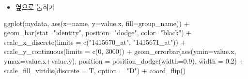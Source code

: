 \documentclass[
]{book}
\newenvironment{Shaded}{\begin{snugshade}}{\end{snugshade}}
\newcommand{\AttributeTok}[1]{\textcolor[rgb]{0.77,0.63,0.00}{#1}}
\newcommand{\DecValTok}[1]{\textcolor[rgb]{0.00,0.00,0.81}{#1}}
\newcommand{\FloatTok}[1]{\textcolor[rgb]{0.00,0.00,0.81}{#1}}
\newcommand{\FunctionTok}[1]{\textcolor[rgb]{0.00,0.00,0.00}{#1}}
\newcommand{\NormalTok}[1]{#1}
\newcommand{\SpecialCharTok}[1]{\textcolor[rgb]{0.00,0.00,0.00}{#1}}
\newcommand{\StringTok}[1]{\textcolor[rgb]{0.31,0.60,0.02}{#1}}
\providecommand{\tightlist}{%
  \setlength{\itemsep}{0pt}\setlength{\parskip}{0pt}}
\begin{document}
\begin{itemize}
\tightlist
\item
  옆으로 눕히기
\end{itemize}

\begin{Shaded}
\begin{Highlighting}[]
\FunctionTok{ggplot}\NormalTok{(mydata, }\FunctionTok{aes}\NormalTok{(}\AttributeTok{x=}\NormalTok{name, }\AttributeTok{y=}\NormalTok{value.x, }\AttributeTok{fill=}\NormalTok{group\_name)) }\SpecialCharTok{+}
  \FunctionTok{geom\_bar}\NormalTok{(}\AttributeTok{stat=}\StringTok{"identity"}\NormalTok{, }\AttributeTok{position=}\StringTok{"dodge"}\NormalTok{, }\AttributeTok{color=}\StringTok{"black"}\NormalTok{) }\SpecialCharTok{+}
  \FunctionTok{scale\_x\_discrete}\NormalTok{(}\AttributeTok{limits =} \FunctionTok{c}\NormalTok{(}\StringTok{"1415670\_at"}\NormalTok{, }\StringTok{"1415671\_at"}\NormalTok{)) }\SpecialCharTok{+}
  \FunctionTok{scale\_y\_continuous}\NormalTok{(}\AttributeTok{limits =} \FunctionTok{c}\NormalTok{(}\DecValTok{0}\NormalTok{, }\DecValTok{3000}\NormalTok{)) }\SpecialCharTok{+}
  \FunctionTok{geom\_errorbar}\NormalTok{(}\FunctionTok{aes}\NormalTok{(}\AttributeTok{ymin=}\NormalTok{value.x, }\AttributeTok{ymax=}\NormalTok{value.x}\SpecialCharTok{+}\NormalTok{value.y),}
                \AttributeTok{position =} \FunctionTok{position\_dodge}\NormalTok{(}\AttributeTok{width=}\FloatTok{0.9}\NormalTok{), }
                \AttributeTok{width =} \FloatTok{0.2}\NormalTok{) }\SpecialCharTok{+}
  \FunctionTok{scale\_fill\_viridis}\NormalTok{(}\AttributeTok{discrete =}\NormalTok{ T, }\AttributeTok{option =} \StringTok{"D"}\NormalTok{) }\SpecialCharTok{+}
  \FunctionTok{coord\_flip}\NormalTok{() }
\end{Highlighting}
\end{Shaded}
\end{document}
